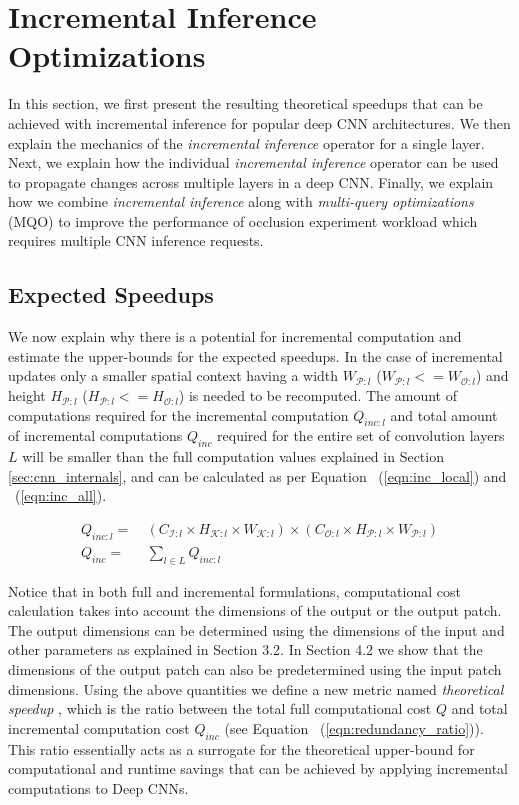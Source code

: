 \section{Incremental Inference Optimizations}\label{sec:exact}

In this section, we first present the resulting theoretical speedups that can be achieved with incremental inference for popular deep CNN architectures.
We then explain the mechanics of the \textit{incremental inference} operator for a single layer.
Next, we explain how the individual \textit{incremental inference} operator can be used to propagate changes across multiple layers in a deep CNN.
Finally, we explain how we combine \textit{incremental inference} along with \textit{multi-query optimizations} (MQO) to improve the performance of occlusion experiment workload which requires multiple CNN inference requests.

\subsection{Expected Speedups}
We now explain why there is a potential for incremental computation and estimate the upper-bounds for the expected speedups.
In the case of incremental updates only a smaller spatial context having a width $W_{\mathcal{P}:l}$ ($W_{\mathcal{P}:l}<=W_{\mathcal{O}:l}$) and height $H_{\mathcal{P}:l}$ ($H_{\mathcal{P}:l}<=H_{\mathcal{O}:l}$) is needed to be recomputed.
The amount of computations required for the incremental computation $Q_{inc:l}$ and total amount of incremental computations $Q_{inc}$ required for the entire set of convolution layers $L$ will be smaller than the full computation values explained in Section \ref{sec:cnn_internals}, and can be calculated as per Equation ~(\ref{eqn:inc_local}) and ~(\ref{eqn:inc_all}).

\begin{align}
\label{eqn:inc_local}
Q_{inc:l} =&~ (C_{\mathcal{I}:l} \times H_{\mathcal{K}:l} \times W_{\mathcal{K}:l}) \times (C_{\mathcal{O}:l} \times H_{\mathcal{P}:l} \times W_{\mathcal{P}:l})\\
\label{eqn:inc_all}
Q_{inc} =&~ \sum_{l \in L} Q_{inc:l}
\end{align}


Notice that in both full and incremental formulations, computational cost calculation takes into account the dimensions of the output or the output patch.
The output dimensions can be determined using the dimensions of the input and other parameters as explained in Section 3.2.
In Section 4.2 we show that the dimensions of the output patch can also be predetermined using the input patch dimensions.
Using the above quantities we define a new metric named \textit{theoretical speedup} , which is the ratio between the total full computational cost $Q$ and total incremental computation cost $Q_{inc}$ (see Equation ~(\ref{eqn:redundancy_ratio})).
This ratio essentially acts as a surrogate for the theoretical upper-bound for computational and runtime savings that can be achieved by applying incremental computations to Deep CNNs.

